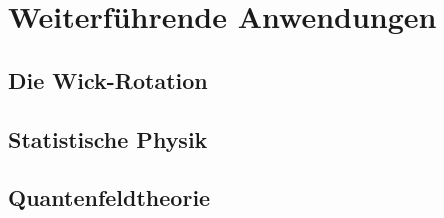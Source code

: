 \section{Weiterführende Anwendungen}

\subsection{Die Wick-Rotation}

\subsection{Statistische Physik}

\subsection{Quantenfeldtheorie}